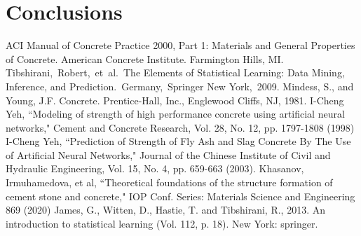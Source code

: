 \documentclass[conference]{IEEEtran}
\begin{document}





\section{Conclusions}\label{sec:conclusions}


\begin{thebibliography}{00}
 ACI Manual of Concrete Practice 2000, Part 1: Materials and General Properties of Concrete.  American Concrete Institute.  Farmington Hills, MI.
 Tibshirani, Robert, et al. The Elements of  Statistical Learning:  Data Mining, Inference, and Prediction. Germany, Springer New York, 2009.
 Mindess, S., and Young, J.F. Concrete. Prentice-Hall, Inc., Englewood Cliffs, NJ, 1981.
 I-Cheng Yeh, ``Modeling of strength of high performance concrete using artificial neural networks," Cement and Concrete Research, Vol. 28, No. 12, pp. 1797-1808 (1998)
 I-Cheng Yeh, ``Prediction of Strength of Fly Ash and Slag Concrete By The Use of Artificial Neural Networks," Journal of the Chinese Institute of Civil and Hydraulic Engineering, Vol. 15, No. 4, pp. 659-663 (2003). 
 Khasanov, Irmuhamedova, et al, ``Theoretical foundations of the structure formation of cement stone
and concrete," IOP Conf. Series: Materials Science and Engineering 869 (2020)
 James, G., Witten, D., Hastie, T. and Tibshirani, R., 2013. An introduction to statistical learning (Vol. 112, p. 18). New York: springer.

\end{thebibliography}
\end{document}
